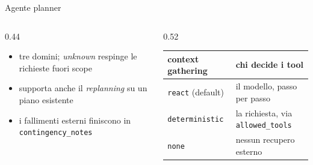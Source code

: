\documentclass[aspectratio=169,11pt]{beamer}
\begin{document}
\begin{frame}{Agente planner}
\begin{columns}[t,onlytextwidth]
\begin{column}{0.44\textwidth}
\scriptsize
\vspace{-5.1em}
\begin{itemize}\setlength\itemsep{1pt}
  \item tre domini; \emph{unknown} respinge le richieste fuori scope
  \item supporta anche il \emph{replanning} su un piano esistente
  \item i fallimenti esterni finiscono in \texttt{contingency\_notes}
\end{itemize}
\end{column}
\begin{column}{0.52\textwidth}
\centering\scriptsize\renewcommand{\arraystretch}{0.95}
\begin{tabular}{@{}ll@{}}
\toprule
\textbf{context gathering} & \textbf{chi decide i tool} \\
\midrule
\texttt{react} (default) & il modello, passo per passo \\
\texttt{deterministic} & la richiesta, via \texttt{allowed\_tools} \\
\texttt{none} & nessun recupero esterno \\
\bottomrule
\end{tabular}
\end{column}
\end{columns}
\end{frame}
\end{document}

